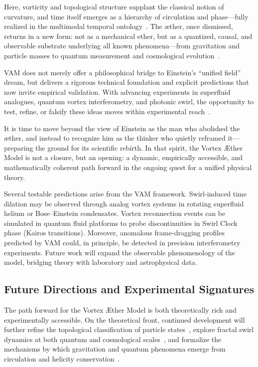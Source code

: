 Here, vorticity and topological structure supplant the classical notion of curvature, and time itself emerges as a hierarchy of circulation and phase—fully realized in the multimodal temporal ontology~\cite{VAM-13, VAM-15}. The æther, once dismissed, returns in a new form: not as a mechanical ether, but as a quantized, causal, and observable substrate underlying all known phenomena—from gravitation and particle masses to quantum measurement and cosmological evolution~\cite{VAM-8, VAM-11, VAM-15}.

VAM does not merely offer a philosophical bridge to Einstein’s “unified field” dream, but delivers a rigorous technical foundation and explicit predictions that now invite empirical validation. With advancing experiments in superfluid analogues, quantum vortex interferometry, and photonic swirl, the opportunity to test, refine, or falsify these ideas moves within experimental reach~\cite{VAM-2, VAM-13, VAM-15}.

It is time to move beyond the view of Einstein as the man who abolished the æther, and instead to recognize him as the thinker who quietly reframed it—preparing the ground for its scientific rebirth. In that spirit, the Vortex Æther Model is not a closure, but an opening: a dynamic, empirically accessible, and mathematically coherent path forward in the ongoing quest for a unified physical theory.

Several testable predictions arise from the VAM framework. Swirl-induced time dilation may be observed through analog vortex systems in rotating superfluid helium or Bose–Einstein condensates. Vortex reconnection events can be simulated in quantum fluid platforms to probe discontinuities in Swirl Clock phase (Kairos transitions). Moreover, anomalous frame-dragging profiles predicted by VAM could, in principle, be detected in precision interferometry experiments. Future work will expand the observable phenomenology of the model, bridging theory with laboratory and astrophysical data.


\subsection*{Future Directions and Experimental Signatures}

The path forward for the Vortex Æther Model is both theoretically rich and experimentally accessible. On the theoretical front, continued development will further refine the topological classification of particle states~\cite{VAM-11, VAM-14}, explore fractal swirl dynamics at both quantum and cosmological scales~\cite{VAM-12, VAM-9}, and formalize the mechanisms by which gravitation and quantum phenomena emerge from circulation and helicity conservation~\cite{VAM-13, VAM-15}.

